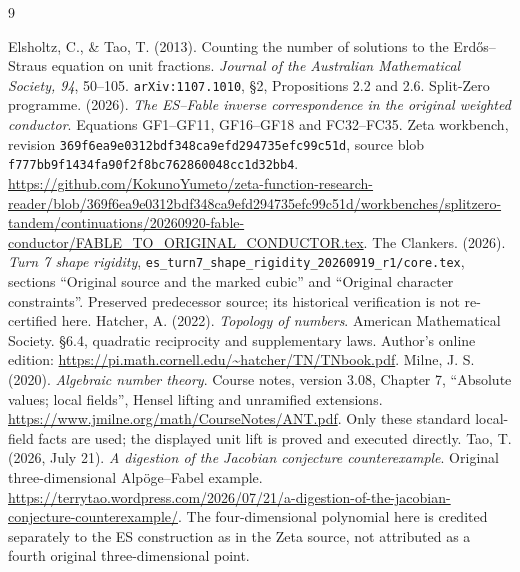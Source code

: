 \documentclass[11pt,reqno]{amsart}
\begin{document}
\begin{thebibliography}{9}
\small\raggedright
{} Elsholtz, C., \& Tao, T. (2013). Counting the number of solutions
to the Erd\H{o}s--Straus equation on unit fractions. \emph{Journal of the Australian
Mathematical Society, 94}, 50--105. \texttt{arXiv:1107.1010}, \S2,
Propositions 2.2 and 2.6.
 Split-Zero programme. (2026). \emph{The ES--Fable inverse
correspondence in the original weighted conductor}. Equations GF1--GF11,
GF16--GF18 and FC32--FC35. Zeta workbench, revision
\texttt{369f6ea9e0312bdf348ca9efd294735efc99c51d}, source blob
\texttt{f777bb9f1434fa90f2f8bc762860048cc1d32bb4}.
\url{https://github.com/KokunoYumeto/zeta-function-research-reader/blob/369f6ea9e0312bdf348ca9efd294735efc99c51d/workbenches/splitzero-tandem/continuations/20260920-fable-conductor/FABLE_TO_ORIGINAL_CONDUCTOR.tex}.
 The Clankers. (2026). \emph{Turn 7 shape rigidity},
\texttt{es\_turn7\_shape\_rigidity\_20260919\_r1/core.tex}, sections
``Original source and the marked cubic'' and ``Original character constraints''.
Preserved predecessor source; its historical verification is not re-certified here.
 Hatcher, A. (2022). \emph{Topology of numbers}.
American Mathematical Society. \S6.4, quadratic reciprocity and supplementary laws.
Author's online edition: \url{https://pi.math.cornell.edu/~hatcher/TN/TNbook.pdf}.
 Milne, J. S. (2020). \emph{Algebraic number theory}.
Course notes, version 3.08, Chapter 7, ``Absolute values; local fields'', Hensel lifting and
unramified extensions. \url{https://www.jmilne.org/math/CourseNotes/ANT.pdf}.
Only these standard local-field facts are used; the displayed unit lift is proved
and executed directly.
 Tao, T. (2026, July 21). \emph{A digestion of the Jacobian conjecture
counterexample}. Original three-dimensional Alp\"oge--Fabel example.
\url{https://terrytao.wordpress.com/2026/07/21/a-digestion-of-the-jacobian-conjecture-counterexample/}.
The four-dimensional polynomial here is credited separately to the ES construction
as in the Zeta source, not attributed as a fourth original three-dimensional point.
\end{thebibliography}
\end{document}
